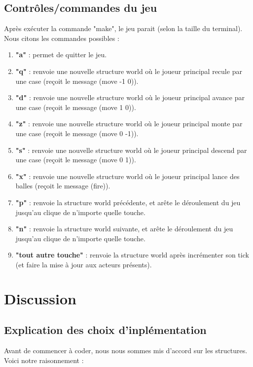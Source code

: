 \documentclass[a4paper]{article}
\begin{document}
\subsection{Contrôles/commandes du jeu}\label{commandes}
Après exécuter la commande "make", le jeu parait (selon la taille du terminal). Nous citons les commandes possibles :
\begin{enumerate}
    \item \textbf{"a"} : permet de quitter le jeu. 
    \item \textbf{"q"} : renvoie une nouvelle structure world où le joueur principal recule par une case (reçoit le message (move -1 0)).
    \item \textbf{"d"} : renvoie une nouvelle structure world où le joueur principal avance par une case (reçoit le message (move 1 0)).
    \item \textbf{"z"} : renvoie une nouvelle structure world où le joueur principal monte par une case (reçoit le message (move 0 -1)).
    \item \textbf{"s"} : renvoie une nouvelle structure world où le joueur principal descend par une case (reçoit le message (move 0 1)).
    \item \textbf{"x"} : renvoie une nouvelle structure world où le joueur principal lance des balles (reçoit le message (fire)).
    \item \textbf{"p"} : renvoie la structure world précédente, et arête le déroulement du jeu jusqu'au clique de n'importe quelle touche.
    \item \textbf{"n"} : renvoie la structure world suivante, et arête le déroulement du jeu jusqu'au clique de n'importe quelle touche.
    \item \textbf{"tout autre touche"} : renvoie la structure world après incrémenter son tick (et faire la mise à jour aux acteurs présents).
\end{enumerate}

\section{Discussion}

\subsection{Explication des choix d'inplémentation}
Avant de commencer à coder, nous nous sommes mis d'accord sur les structures. Voici notre raisonnement :
\end{document}
